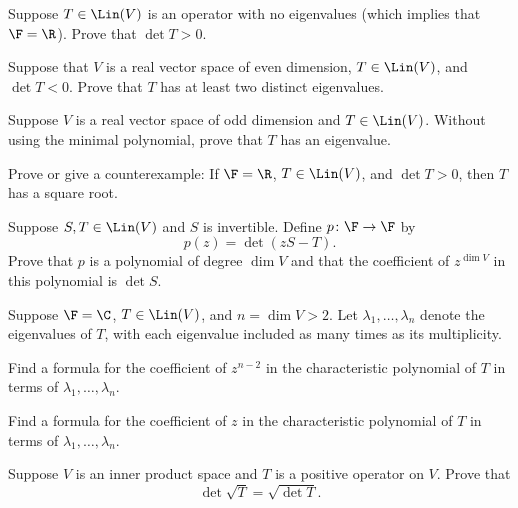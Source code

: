 \begin{exc}
\begin{exercise}
Suppose $T\in\Lin(V)$ is an operator with no eigenvalues (which implies that
$\F=\R$). Prove that $\det T>0$.
\end{exercise}

\begin{exercise}
Suppose that $V$ is a real vector space of even dimension, $T\in\Lin(V)$, and
$\det T<0$. Prove that $T$ has at least two distinct eigenvalues.
\end{exercise}

\begin{exercise}
Suppose $V$ is a real vector space of odd dimension and $T\in\Lin(V)$. Without
using the minimal polynomial, prove that $T$ has an eigenvalue.
\end{exercise}

\begin{exercise}
Prove or give a counterexample: If $\F=\R$, $T\in\Lin(V)$, and $\det T>0$, then
$T$ has a square root.
\end{exercise}

\begin{exercise}
Suppose $S,T\in\Lin(V)$ and $S$ is invertible. Define $p\colon\F\to\F$ by
\[ p(z) = \det(zS-T). \]
Prove that $p$ is a polynomial of degree $\dim V$ and that the coefficient of
$z^{\dim V}$ in this polynomial is $\det S$.
\end{exercise}

\begin{exercise}
Suppose $\F=\C$, $T\in\Lin(V)$, and $n=\dim V>2$. Let
$\lambda_1,\dots,\lambda_n$ denote the eigenvalues of $T$, with each eigenvalue
included as many times as its multiplicity.
\begin{parts}
\item Find a formula for the coefficient of $z^{n-2}$ in the characteristic
  polynomial of $T$ in terms of $\lambda_1,\dots,\lambda_n$.
\item Find a formula for the coefficient of $z$ in the characteristic
  polynomial of $T$ in terms of $\lambda_1,\dots,\lambda_n$.
\end{parts}
\end{exercise}

\begin{exercise}
Suppose $V$ is an inner product space and $T$ is a positive operator on $V$.
Prove that
\[ \det\sqrt{T} = \sqrt{\det T}. \]
\end{exercise}


\end{exc}
